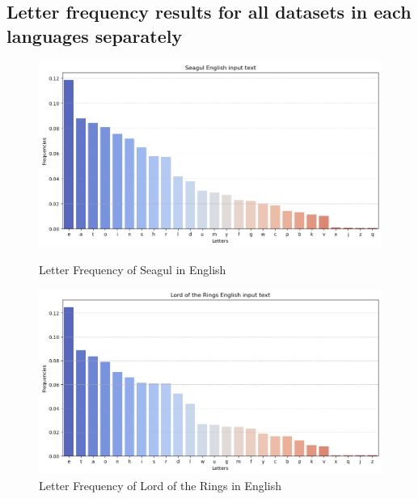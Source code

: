 \newpage

\subsection*{Letter frequency results for all datasets in each languages separately} 

\begin{figure}[htbp]
    \centering
    \begin{minipage}[b]{0.45\textwidth}
        \centering
        \includegraphics[width=\textwidth]{media/seagulEnglish.png} 
        \caption{Letter Frequency of Seagul in English}
    \end{minipage}
    \hfill
    \begin{minipage}[b]{0.45\textwidth}
        \centering
        \includegraphics[width=\textwidth]{media/lordOfTheRingsEnglish.png}
        \caption{Letter Frequency of Lord of the Rings in English}
    \end{minipage}
\end{figure}

